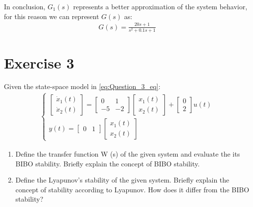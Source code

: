 \documentclass[a4paper]{article}
\begin{document}
In conclusion, $G_1(s)$ represents a better approximation of the system behavior, for this reason we can represent $G(s)$ as:
\begin{align}
\label{eq:Question_2_eq}
G(s) =  \frac{20 s + 1}{
s^2 + 0.1 s + 1}
\end{align}

\section*{Exercise 3}
Given the state-space model in \eqref{eq:Question_3_eq}:
\begin{align}
\label{eq:Question_3_eq}
\begin{cases}
\begin{bmatrix}\dot{x}_1(t)\\
\dot{x}_2(t)\end{bmatrix}= \begin{bmatrix}0 & 1 \\
-5 & -2 \end{bmatrix}\begin{bmatrix}x_1(t) \\x_2(t)\end{bmatrix}+\begin{bmatrix}0\\2\end{bmatrix}u(t)\\
y(t) = \begin{bmatrix} 0 & 1\end{bmatrix}\begin{bmatrix}x_1(t) \\ x_2(t)\end{bmatrix}
\end{cases}\end{align}
\begin{enumerate}
    \item Define the transfer function W (s) of the given system and evaluate the its BIBO stability. Briefly explain the concept of BIBO stability.
    \item Define the Lyapunov's stability of the given system. Briefly explain the concept of stability according to Lyapunov. How does it differ from the BIBO stability?
\end{enumerate}
\end{document}
